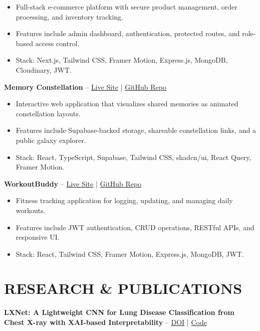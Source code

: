 \documentclass[10pt,a4paper]{article}
\begin{document}
\begin{itemize}
    \item Full-stack e-commerce platform with secure product management, order processing, and inventory tracking.
    \item Features include admin dashboard, authentication, protected routes, and role-based access control.
    \item Stack: Next.js, Tailwind CSS, Framer Motion, Express.js, MongoDB, Cloudinary, JWT.
\end{itemize}

\textbf{Memory Constellation}
--
\href{https://maya-orbit.vercel.app/}{Live Site}
|
\href{https://github.com/sakibnjr/memory-constellation}{GitHub Repo}

\begin{itemize}
    \item Interactive web application that visualizes shared memories as animated constellation layouts.
    \item Features include Supabase-backed storage, shareable constellation links, and a public galaxy explorer.
    \item Stack: React, TypeScript, Supabase, Tailwind CSS, shadcn/ui, React Query, Framer Motion.
\end{itemize}

\textbf{WorkoutBuddy}
--
\href{https://workout-buddy-vert-five.vercel.app/}{Live Site}
|
\href{https://github.com/sakibnjr/WorkoutBuddy}{GitHub Repo}

\begin{itemize}
    \item Fitness tracking application for logging, updating, and managing daily workouts.
    \item Features include JWT authentication, CRUD operations, RESTful APIs, and responsive UI.
    \item Stack: React, Tailwind CSS, Framer Motion, Express.js, MongoDB, JWT.
\end{itemize}


\section*{RESEARCH \& PUBLICATIONS}

\textbf{LXNet: A Lightweight CNN for Lung Disease Classification from Chest X-ray with XAI-based Interpretability}
--
\href{https://doi.org/10.1371/journal.pone.0351762}{DOI}
|
\href{https://github.com/sakibnjr/LXNet-----Lightweight-CNN/tree/main/Updated}{Code}
\end{document}
